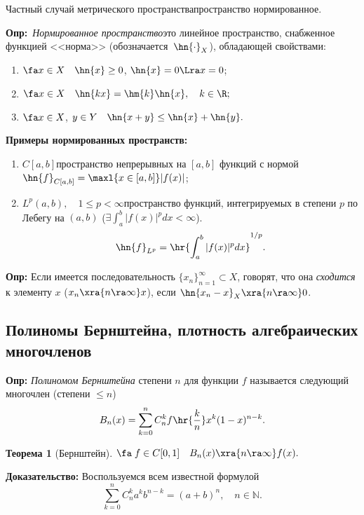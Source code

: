 \documentclass[a4paper]{article}
\def\defin{\noindent\textbf{Опр:}\ }
\begin{document}
Частный случай метрического пространства\т пространство нормированное.

\defin \emph{Нормированное пространство}\т это линейное пространство, снабженное функцией
<<норма>> (обозначается~$\hn{\cdot}_X$), обладающей свойствами:
\begin{enumerate}
\item
$\fa x\in X\quad\hn{x}\ge 0$, $\hn{x}=0\Lra x=0$;
\item
$\fa x\in X\quad\hn{kx}=\hm{k}\hn{x},\quad k\in\R;$
\item
$\fa x\in X$, $y\in Y\quad\hn{x+y}\le\hn{x}+\hn{y}.$
\end{enumerate}

\noindent\textbf{Примеры нормированных пространств:}
\begin{enumerate}
\item
$C[a,b]$\т пространство непрерывных на $[a,b]$ функций с нормой
$\hn{f}_{C[a,b]}=\maxl{x\in[a,b]}|f(x)|$;
\item
$L^p(a,b),\quad 1\le p<\infty$\т пространство функций,
интегрируемых в степени $p$ по Лебегу на $(a,b)$ ( $\exi\int_a^b|f(x)|^pdx<\infty$).
$$\hn{f}_{L^p}=\hr{\int_a^b|f(x)|^pdx }^{1/p}.$$

\end{enumerate}

\noindent\textbf{Опр:} Если имеется последовательность
$\{x_n\}_{n=1}^{\infty}\subset X$, говорят, что она
\emph{сходится} к элементу $x$ ($x_n\xra{n\ra\infty} x$), если
$\hn{x_n-x}_X\xra{n\ra\infty} 0$.

\subsection{Полиномы Бернштейна, плотность алгебраических
многочленов}

\textbf{Опр:} \emph{Полиномом Бернштейна} степени $n$ для функции
$f$ называется следующий многочлен (степени $\le n$)
$$B_n(x)=\sum\limits_{k=0}^n C_n^k f\hr{\frac{k}{n}}x^k(1-x)^{n-k}.$$
\newtheorem{theorems}{Теорема}[section]
\newtheorem{lemms}{Лемма}[section]
\newtheorem{sled}{Следствие}[section]
\newtheorem{utv}{Утверждение}[section]
\begin{theorems}[Бернштейн]
$\fa \;f\in C[0,1]\quad B_n(x)\xra{n\ra\infty}
f(x).$
\end{theorems}
\textbf{Доказательство:} Воспользуемся всем известной формулой
\begin{equation}\label{1}
\sum_{k=0}^n C_n^k a^k b^{n-k}=(a+b)^n,\quad n\in\mathbb{N}.
\end{equation}
\end{document}

